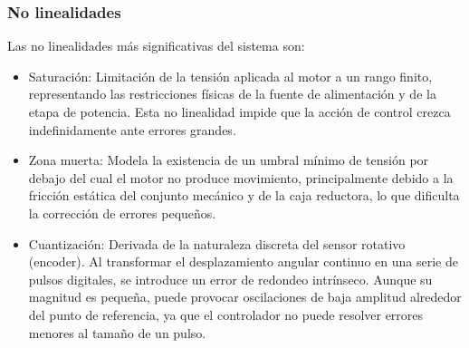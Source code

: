 \subsubsection{No linealidades}
\label{no_linealidades}

Las no linealidades más significativas del sistema son:

\begin{itemize}
	\item Saturación: Limitación de la tensión aplicada al motor a un rango finito, representando las restricciones físicas de la fuente de alimentación y de la etapa de potencia. Esta no linealidad impide que la acción de control crezca indefinidamente ante errores grandes.
	
	\item Zona muerta: Modela la existencia de un umbral mínimo de tensión por debajo del cual el motor no produce movimiento, principalmente debido a la fricción estática del conjunto mecánico y de la caja reductora, lo que dificulta la corrección de errores pequeños.
	
	\item Cuantización: Derivada de la naturaleza discreta del sensor rotativo (encoder). Al transformar el desplazamiento angular continuo en una serie de pulsos digitales, se introduce un error de redondeo intrínseco. Aunque su magnitud es pequeña, puede provocar oscilaciones de baja amplitud alrededor del punto de referencia, ya que el controlador no puede resolver errores menores al tamaño de un pulso.

\end{itemize}